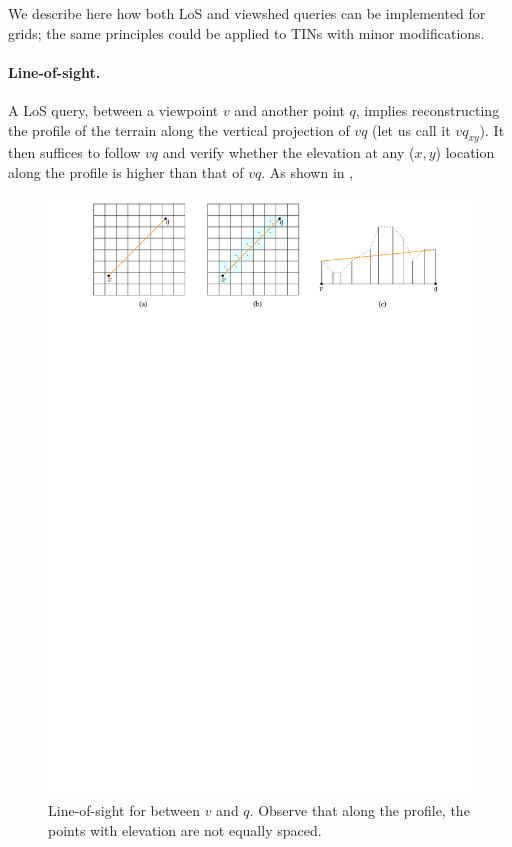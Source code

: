 %

We describe here how both LoS and viewshed queries can be implemented for grids; the same principles could be applied to TINs with minor modifications.


\paragraph{Line-of-sight.}
A LoS query, between a viewpoint $v$ and another point $q$, implies reconstructing the profile of the terrain along the vertical projection of $vq$ (let us call it $vq_{xy}$).
It then suffices to follow $vq$ and verify whether the elevation at any ($x,y$) location along the profile is higher than that of $vq$.
As shown in , 
\begin{figure}
  \centering
  \includegraphics[width=\linewidth]{figs/los}
  \caption{Line-of-sight for between $v$ and $q$. Observe that along the profile, the points with elevation are not equally spaced.}%
\end{figure}

